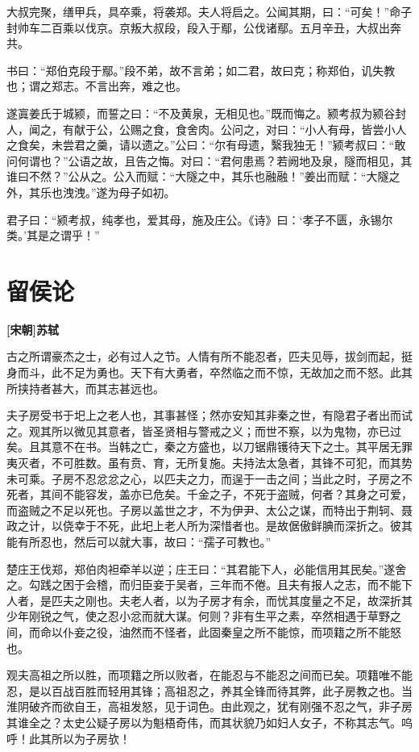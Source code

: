 \documentclass[UTF8,titlepage,oneside]{ctexbook}
\begin{document}
大叔完聚，缮甲兵，具卒乘，将袭郑。夫人将启之。公闻其期，曰：“可矣！”命子封帅车二百乘以伐京。京叛大叔段，段入于鄢，公伐诸鄢。五月辛丑，大叔出奔共。

书曰：“郑伯克段于鄢。”段不弟，故不言弟；如二君，故曰克；称郑伯，讥失教也；谓之郑志。不言出奔，难之也。

遂寘姜氏于城颍，而誓之曰：“不及黄泉，无相见也。”既而悔之。颍考叔为颍谷封人，闻之，有献于公，公赐之食，食舍肉。公问之，对曰：“小人有母，皆尝小人之食矣，未尝君之羹，请以遗之。”公曰：“尔有母遗，繄我独无！”颍考叔曰：“敢问何谓也？”公语之故，且告之悔。对曰：“君何患焉？若阙地及泉，隧而相见，其谁曰不然？”公从之。公入而赋：“大隧之中，其乐也融融！”姜出而赋：“大隧之外，其乐也洩洩。”遂为母子如初。

君子曰：“颍考叔，纯孝也，爱其母，施及庄公。《诗》曰：‘孝子不匮，永锡尔类。’其是之谓乎！”


\chapter*{留侯论}
\begin{center}
	\textbf{[宋朝]苏轼}
\end{center}

古之所谓豪杰之士，必有过人之节。人情有所不能忍者，匹夫见辱，拔剑而起，挺身而斗，此不足为勇也。天下有大勇者，卒然临之而不惊，无故加之而不怒。此其所挟持者甚大，而其志甚远也。


夫子房受书于圯上之老人也，其事甚怪；然亦安知其非秦之世，有隐君子者出而试之。观其所以微见其意者，皆圣贤相与警戒之义；而世不察，以为鬼物，亦已过矣。且其意不在书。当韩之亡，秦之方盛也，以刀锯鼎镬待天下之士。其平居无罪夷灭者，不可胜数。虽有贲、育，无所复施。夫持法太急者，其锋不可犯，而其势未可乘。子房不忍忿忿之心，以匹夫之力，而逞于一击之间；当此之时，子房之不死者，其间不能容发，盖亦已危矣。千金之子，不死于盗贼，何者？其身之可爱，而盗贼之不足以死也。子房以盖世之才，不为伊尹、太公之谋，而特出于荆轲、聂政之计，以侥幸于不死，此圯上老人所为深惜者也。是故倨傲鲜腆而深折之。彼其能有所忍也，然后可以就大事，故曰：“孺子可教也。”


楚庄王伐郑，郑伯肉袒牵羊以逆；庄王曰：“其君能下人，必能信用其民矣。”遂舍之。勾践之困于会稽，而归臣妾于吴者，三年而不倦。且夫有报人之志，而不能下人者，是匹夫之刚也。夫老人者，以为子房才有余，而忧其度量之不足，故深折其少年刚锐之气，使之忍小忿而就大谋。何则？非有生平之素，卒然相遇于草野之间，而命以仆妾之役，油然而不怪者，此固秦皇之所不能惊，而项籍之所不能怒也。


观夫高祖之所以胜，而项籍之所以败者，在能忍与不能忍之间而已矣。项籍唯不能忍，是以百战百胜而轻用其锋；高祖忍之，养其全锋而待其弊，此子房教之也。当淮阴破齐而欲自王，高祖发怒，见于词色。由此观之，犹有刚强不忍之气，非子房其谁全之？太史公疑子房以为魁梧奇伟，而其状貌乃如妇人女子，不称其志气。呜呼！此其所以为子房欤！
\end{document}
